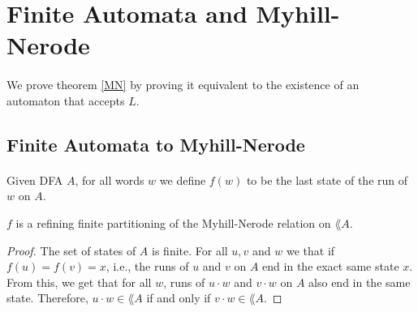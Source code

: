                                         \section{Finite Automata and Myhill-Nerode}

                                        \paragraph{}
                                        We prove theorem \ref{MN} by proving it equivalent to the existence of an automaton that accepts $L$.



                                        \subsection{Finite Automata to Myhill-Nerode}
                                        \paragraph{}
                                        Given DFA $A$, for all words $w$ we define $f(w)$ to be the last state of the run of $w$ on $A$.

                                        \begin{lemma} 
                                            \label{DFA_MN_F}
                                            $f$ is a refining finite partitioning of the Myhill-Nerode relation on $\lang{A}$. 
                                        \end{lemma} 
                                        \begin{proof} 
                                            The set of states of $A$ is finite.
                                            For all $u, v$ and $w$ we that if $f(u) = f(v) = x$, i.e.,
                                            the runs of $u$ and $v$ on $A$ end in the exact same state $x$.
                                            From this, we get that for all $w$, runs of $u \cdot w$ and $v \cdot w$ on $A$ also end in the same state.
                                            Therefore, $u\cdot w \in \lang{A}$ if and only if $v \cdot w \in \lang{A}$.
                                        \end{proof}

